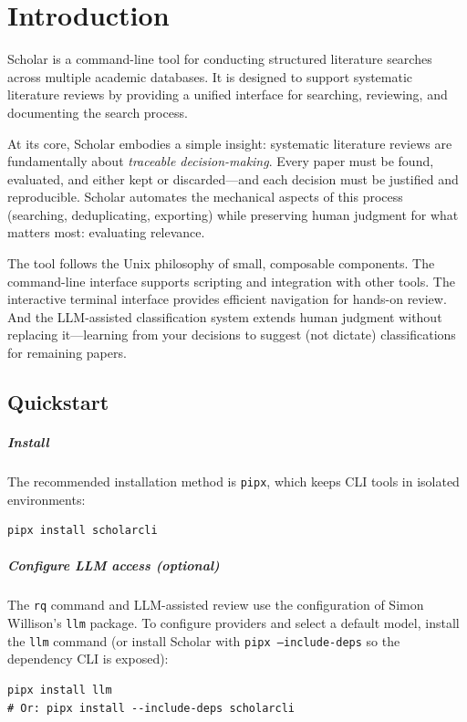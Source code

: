 \chapter{Introduction}
\label{ch:introduction}

Scholar is a command-line tool for conducting structured literature searches
across multiple academic databases.
It is designed to support systematic literature reviews by providing a unified
interface for searching, reviewing, and documenting the search process.

At its core, Scholar embodies a simple insight: systematic literature reviews
are fundamentally about \emph{traceable decision-making}.
Every paper must be found, evaluated, and either kept or discarded---and each
decision must be justified and reproducible.
Scholar automates the mechanical aspects of this process (searching,
deduplicating, exporting) while preserving human judgment for what matters
most: evaluating relevance.

The tool follows the Unix philosophy of small, composable components.
The command-line interface supports scripting and integration with other tools.
The interactive terminal interface provides efficient navigation for
hands-on review.
And the LLM-assisted classification system extends human judgment without
replacing it---learning from your decisions to suggest (not dictate)
classifications for remaining papers.


\section{Quickstart}

\paragraph{Install}
The recommended installation method is \texttt{pipx}, which keeps CLI
tools in isolated environments:
\begin{verbatim}
pipx install scholarcli
\end{verbatim}

\paragraph{Configure LLM access (optional)}
The \texttt{rq} command and LLM-assisted review use the configuration
of Simon Willison's \texttt{llm} package.
To configure providers and select a default model, install the \texttt{llm}
command (or install Scholar with \texttt{pipx --include-deps} so the
dependency CLI is exposed):
\begin{verbatim}
pipx install llm
# Or: pipx install --include-deps scholarcli
\end{verbatim}


